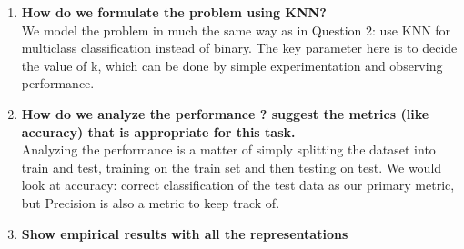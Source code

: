 \documentclass[10pt]{article}
\begin{document}
\begin{enumerate}
    \item \textbf{How do we formulate the problem using KNN?}\\
    We model the problem in much the same way as in Question 2: use KNN for multiclass classification instead of binary. The key parameter here is to decide the value of k, which can be done by simple experimentation and observing performance.
    
    \item \textbf{How do we analyze the performance ? suggest  the  metrics  (like  accuracy) that is appropriate for this task.}\\
    Analyzing the performance is a matter of simply splitting the dataset into train and test, training on the train set and then testing on test. We would look at accuracy: correct classification of the test data as our primary metric, but Precision is also a metric to keep track of.
    
    \item \textbf{Show empirical results  with  all  the  representations}\\
    

\begin{table}[H]
\caption{IMFDB Dataset, best results}
\label{tab:4_imfdb}
\end{table}


\begin{table}[H]
\caption{Yale Dataset, best results}
\label{tab:4_yale}
\end{table}



\end{enumerate}
\end{document}
